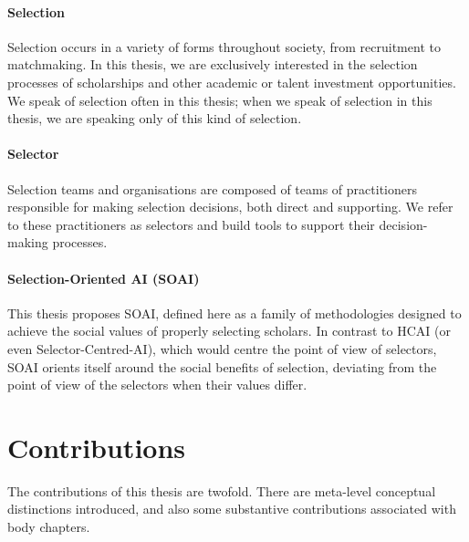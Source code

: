 
\paragraph{Selection}
Selection occurs in a variety of forms throughout society, from recruitment to matchmaking. In this thesis, we are exclusively interested in the selection processes of scholarships and other academic or talent investment opportunities. We speak of selection often in this thesis; when we speak of selection in this thesis, we are speaking only of this kind of selection.

\paragraph{Selector}
Selection teams and organisations are composed of teams of practitioners responsible for making selection decisions, both direct and supporting. We refer to these practitioners as selectors and build tools to support their decision-making processes.

\paragraph{Selection-Oriented AI (SOAI)} 
This thesis proposes SOAI, defined here as a family of methodologies designed to achieve the social values of properly selecting scholars. In contrast to HCAI (or even Selector-Centred-AI), which would centre the point of view of selectors, SOAI orients itself around the social benefits of selection, deviating from the point of view of the selectors when their values differ.

\section{Contributions} 
The contributions of this thesis are twofold. There are meta-level conceptual distinctions introduced, and also some substantive contributions associated with body chapters.

